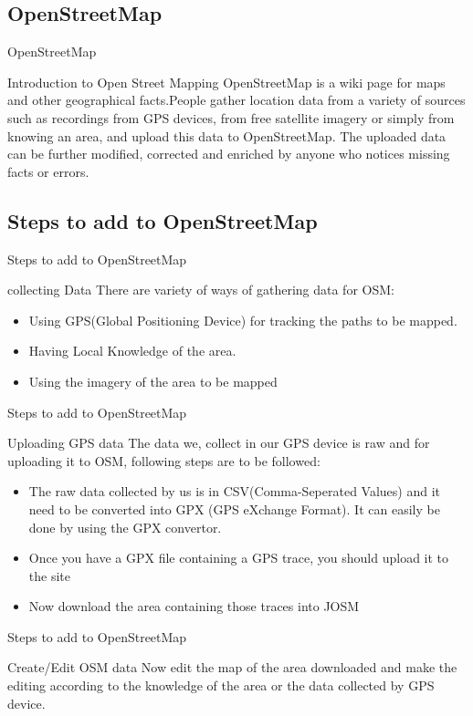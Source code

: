 \subsection{OpenStreetMap}
\begin{frame}{OpenStreetMap}
\begin{block}{Introduction to Open Street Mapping} 
OpenStreetMap is a wiki page for maps and other geographical facts.People gather location data from a variety of sources such as recordings from GPS devices, from free satellite imagery or simply from knowing an area, and upload this data to OpenStreetMap. The uploaded data can be further modified, corrected and enriched by anyone who notices missing facts or errors.\\
\end{block}
\end{frame}

\newpage
\subsection{Steps to add to OpenStreetMap}
\begin{frame}{Steps to add to OpenStreetMap}
\begin{block}{collecting Data}
There are variety of ways of gathering data for OSM:
\begin{itemize}
\item<2-> Using GPS(Global Positioning Device) for tracking the paths to be mapped.
\item<3-> Having Local Knowledge of the area.
\item<4-> Using the imagery of the area to be mapped
\end{itemize}
\end{block}
\end {frame}
\newpage
\begin{frame}{Steps to add to OpenStreetMap}
\begin{block}{Uploading GPS data}
The data we, collect in our GPS device is raw and for uploading it to OSM, following steps are to be followed:
\begin{itemize}
\item<2-> The raw data collected by us is in CSV(Comma-Seperated Values) and it need to be converted into GPX (GPS eXchange Format). It can easily be done by using the GPX convertor.
\item<3-> Once you have a GPX file containing a GPS trace, you should upload it to the site
\item<4-> Now download the area containing those traces into JOSM
\end{itemize}
\end{block}
\end{frame}
\newpage
\begin{frame}{Steps to add to OpenStreetMap}
\begin{block}{Create/Edit OSM data}
Now edit the map of the area downloaded and make the editing according to the knowledge of the area or the data collected by GPS device.
\end{block}
\end{frame}
\newpage
